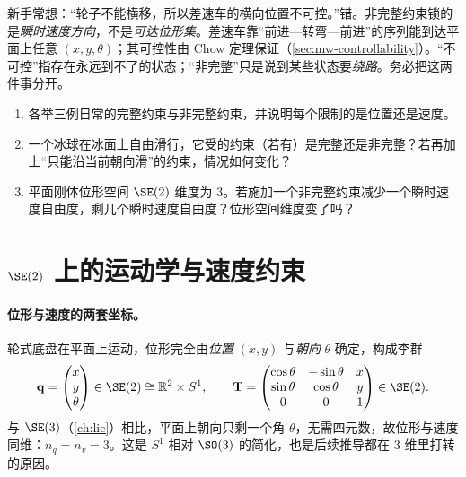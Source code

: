 \begin{pitfall}[概念误区：“非完整 = 不可控”]
新手常想：“轮子不能横移，所以差速车的横向位置不可控。”错。非完整约束锁的是\emph{瞬时速度方向}，不是\emph{可达位形集}。差速车靠“前进—转弯—前进”的序列能到达平面上任意 $(x,y,\theta)$；其可控性由 Chow 定理保证（\cref{sec:mw-controllability}）。“不可控”指存在永远到不了的状态；“非完整”只是说到某些状态要\emph{绕路}。务必把这两件事分开。
\end{pitfall}

\begin{practice}
\begin{enumerate}
  \item 各举三例日常的完整约束与非完整约束，并说明每个限制的是位置还是速度。
  \item 一个冰球在冰面上自由滑行，它受的约束（若有）是完整还是非完整？若再加上“只能沿当前朝向滑”的约束，情况如何变化？
  \item 平面刚体位形空间 $\SE(2)$ 维度为 $3$。若施加一个非完整约束减少一个瞬时速度自由度，剩几个瞬时速度自由度？位形空间维度变了吗？
\end{enumerate}
\end{practice}

\section{\texorpdfstring{$\SE(2)$}{SE(2)} 上的运动学与速度约束}
\label{sec:mw-se2}

\paragraph{位形与速度的两套坐标。}
轮式底盘在平面上运动，位形完全由\emph{位置} $(x,y)$ 与\emph{朝向} $\theta$ 确定，构成李群
\begin{equation}
  \mathbf{q}=\begin{pmatrix}x\\y\\\theta\end{pmatrix}\in\SE(2)\cong\mathbb{R}^2\times S^1,
  \qquad
  \mathbf{T}=\begin{pmatrix}\cos\theta&-\sin\theta&x\\\sin\theta&\cos\theta&y\\0&0&1\end{pmatrix}\in\SE(2).
  \label{eq:mw-se2}
\end{equation}
与 $\SE(3)$（\cref{ch:lie}）相比，平面上朝向只剩一个角 $\theta$，无需四元数，故位形与速度同维：$n_q=n_v=3$。这是 $S^1$ 相对 $\SO(3)$ 的简化，也是后续推导都在 $3$ 维里打转的原因。


